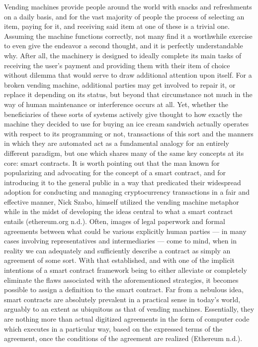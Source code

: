 \documentclass[
  11pt,
]{article}
\begin{document}
Vending machines provide people around the world with snacks and
refreshments on a daily basis, and for the vast majority of people the
process of selecting an item, paying for it, and receiving said item at
one of these is a trivial one. Assuming the machine functions correctly,
not many find it a worthwhile exercise to even give the endeavor a
second thought, and it is perfectly understandable why. After all, the
machinery is designed to ideally complete its main tasks of receiving
the user's payment and providing them with their item of choice without
dilemma that would serve to draw additional attention upon itself. For a
broken vending machine, additional parties may get involved to repair
it, or replace it depending on its status, but beyond that circumstance
not much in the way of human maintenance or interference occurs at all.
Yet, whether the beneficiaries of these sorts of systems actively give
thought to how exactly the machine they decided to use for buying an ice
cream sandwich actually operates with respect to its programming or not,
transactions of this sort and the manners in which they are automated
act as a fundamental analogy for an entirely different paradigm, but one
which shares many of the same key concepts at its core: smart contracts.
It is worth pointing out that the man known for popularizing and
advocating for the concept of a smart contract, and for introducing it
to the general public in a way that predicated their widespread adoption
for conducting and managing cryptocurrency transactions in a fair and
effective manner, Nick Szabo, himself utilized the vending machine
metaphor while in the midst of developing the ideas central to what a
smart contract entails (ethereum.org n.d.). Often, images of legal
paperwork and formal agreements between what could be various explicitly
human parties --- in many cases involving representatives and
intermediaries --- come to mind, when in reality we can adequately and
sufficiently describe a contract as simply an agreement of some sort.
With that established, and with one of the implicit intentions of a
smart contract framework being to either alleviate or completely
eliminate the flaws associated with the aforementioned strategies, it
becomes possible to assign a definition to the smart contract. Far from
a nebulous idea, smart contracts are absolutely prevalent in a practical
sense in today's world, arguably to an extent as ubiquitous as that of
vending machines. Essentially, they are nothing more than actual
digitized agreements in the form of computer code which executes in a
particular way, based on the expressed terms of the agreement, once the
conditions of the agreement are realized (Ethereum n.d.).
\end{document}
